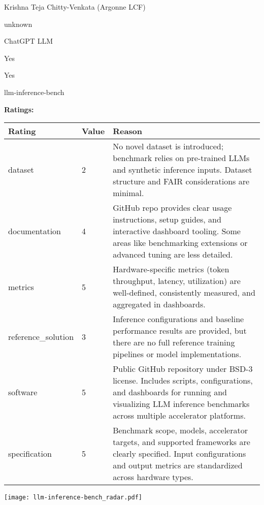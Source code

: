 {{\begin{description}[labelwidth=4cm, labelsep=1em, leftmargin=4cm, itemsep=0.1em, parsep=0em]
  \item[contact.name:] Krishna Teja Chitty-Venkata (Argonne LCF)
  \item[contact.email:] unknown
  \item[results.links.name:] ChatGPT LLM
  \item[fair.reproducible:] Yes
  \item[fair.benchmark\_ready:] Yes
  \item[id:] llm-inference-bench
  \item[Citations:] \cite{10820566}
\end{description}

{\bf Ratings:} ~ \\

\begin{tabular}{p{} p{} p{}}
\hline
Rating & Value & Reason \\
\hline
dataset & 2 & No novel dataset is introduced; benchmark relies on pre-trained LLMs and synthetic inference inputs.
Dataset structure and FAIR considerations are minimal.
 \\
documentation & 4 & GitHub repo provides clear usage instructions, setup guides, and interactive dashboard tooling.
Some areas like benchmarking extensions or advanced tuning are less detailed.
 \\
metrics & 5 & Hardware-specific metrics (token throughput, latency, utilization) are well-defined, consistently measured,
and aggregated in dashboards.
 \\
reference\_solution & 3 & Inference configurations and baseline performance results are provided, but there are no
full reference training pipelines or model implementations.
 \\
software & 5 & Public GitHub repository under BSD-3 license.
Includes scripts, configurations, and dashboards for running and visualizing LLM inference benchmarks
across multiple accelerator platforms.
 \\
specification & 5 & Benchmark scope, models, accelerator targets, and supported frameworks are clearly specified.
Input configurations and output metrics are standardized across hardware types.
 \\
\hline
\end{tabular}

\texttt{[image: llm-inference-bench\_radar.pdf]}
}}
\clearpage